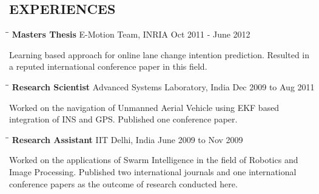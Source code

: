 \documentclass{res}
\begin{document}
\begin{resume}
\section{EXPERIENCES}
\vspace{-0.1in}	
\begin{tabbing}
\hspace{2.3in}\= \hspace{2.6in}\= \kill %
{\bf Masters Thesis} \>E-Motion Team, INRIA \>Oct 2011 - June 2012
		\end{tabbing}\vspace{-18pt}      %
        Learning based approach for online lane change intention prediction. Resulted in a reputed international conference paper in this field.
        \begin{tabbing}
        \hspace{2.3in}\= \hspace{2.6in}\= \kill %
{\bf Research Scientist} \>Advanced Systems Laboratory, India \> Dec 2009 to Aug 2011
        \end{tabbing}\vspace{-18pt}	   %
        Worked on the navigation of Unmanned Aerial Vehicle using EKF based integration of INS and GPS. Published one conference paper.
        \begin{tabbing}%
        \hspace{2.3in}\= \hspace{2.6in}\= \kill %
{\bf Research Assistant}  \>IIT Delhi, India \> June 2009 to Nov 2009

    \end{tabbing}\vspace{-18pt}
    Worked on the applications of Swarm Intelligence in the field of Robotics and Image Processing. Published two international journals and one international conference papers as the outcome of research conducted here.



\end{resume}
\end{document}
